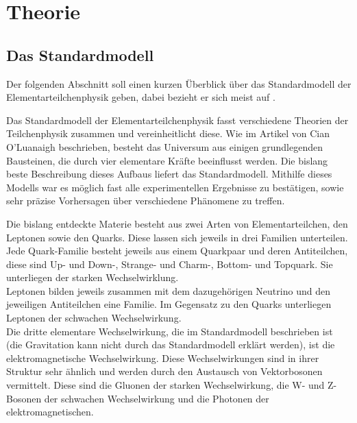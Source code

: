 \chapter{Theorie}
\label{ch:Theorie}

{}	%

\section{Das Standardmodell}
\label{ch:Theorie:sec:Standardmodell}

Der folgenden Abschnitt soll einen kurzen \"Uberblick \"uber das Standardmodell der Elementarteilchenphysik geben, dabei bezieht er sich meist auf \cite{SWB-39819646X}.

Das Standardmodell der Elementarteilchenphysik fasst verschiedene Theorien der Teilchenphysik zusammen und vereinheitlicht diese. Wie im Artikel von Cian O'Luanaigh \cite{O'Luanaigh:1997201} beschrieben, besteht das Universum aus einigen grundlegenden Bausteinen, die durch vier elementare Kr\"afte beeinflusst werden. Die bislang beste Beschreibung dieses Aufbaus liefert das Standardmodell. Mithilfe dieses Modells war es m\"oglich fast alle experimentellen Ergebnisse zu best\"atigen, sowie sehr pr\"azise Vorhersagen \"uber verschiedene Ph\"anomene zu treffen.

Die bislang entdeckte Materie besteht aus zwei Arten von Elementarteilchen, den Leptonen sowie den Quarks. Diese lassen sich jeweils in drei Familien unterteilen. Jede Quark-Familie besteht jeweils aus einem Quarkpaar und deren Antiteilchen, diese sind Up- und Down-, Strange- und Charm-, Bottom- und Topquark. Sie unterliegen der starken Wechselwirklung.\\
Leptonen bilden jeweils zusammen mit dem dazugeh\"origen Neutrino und den jeweiligen Antiteilchen eine Familie. Im Gegensatz zu den Quarks unterliegen Leptonen der schwachen Wechselwirkung.\\
Die dritte elementare Wechselwirkung, die im Standardmodell beschrieben ist (die Gravitation kann nicht durch das Standardmodell erkl\"art werden), ist die elektromagnetische Wechselwirkung. Diese Wechselwirkungen sind in ihrer Struktur sehr \"ahnlich und werden durch den Austausch von Vektorbosonen vermittelt. Diese sind die Gluonen der starken Wechselwirkung, die W- und Z-Bosonen der schwachen Wechselwirkung und die Photonen der elektromagnetischen. 

